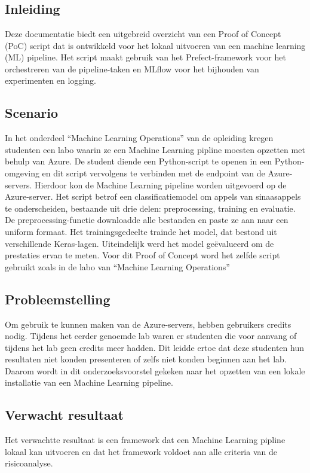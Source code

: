 \chapter{}%
\label{ch:PoC}

\section{Inleiding}
Deze documentatie biedt een uitgebreid overzicht van een Proof of Concept (PoC) script dat is ontwikkeld voor het lokaal uitvoeren van een machine learning (ML) pipeline. Het script maakt gebruik van het Prefect-framework voor het orchestreren van de pipeline-taken en MLflow voor het bijhouden van experimenten en logging.
\section{Scenario}
In het onderdeel ``Machine Learning Operations'' van de opleiding kregen studenten een labo waarin ze een Machine Learning pipline moesten opzetten met behulp van Azure. De student diende een Python-script te openen in een Python-omgeving en dit script vervolgens te verbinden met de endpoint van de Azure-servers.
Hierdoor kon de Machine Learning pipeline worden uitgevoerd op de Azure-server. Het script betrof een classificatiemodel om appels van sinaasappels te onderscheiden, bestaande uit drie delen: preprocessing, training en evaluatie. De preprocessing-functie downloadde alle bestanden en paste ze aan naar een uniform formaat. Het trainingsgedeelte trainde het model, dat bestond uit verschillende Keras-lagen. Uiteindelijk werd het model geëvalueerd om de prestaties ervan te meten.
Voor dit Proof of Concept word het zelfde script gebruikt zoals in de labo van ``Machine Learning Operations''

\section{Probleemstelling}
Om gebruik te kunnen maken van de Azure-servers, hebben gebruikers credits nodig. Tijdens het eerder genoemde lab waren er studenten die voor aanvang of tijdens het lab geen credits meer hadden. Dit leidde ertoe dat deze studenten hun resultaten niet konden presenteren of zelfs niet konden beginnen aan het lab.
Daarom wordt in dit onderzoeksvoorstel gekeken naar het opzetten van een lokale installatie van een Machine Learning pipeline.
\section{Verwacht resultaat}
Het verwachtte resultaat is een framework dat een Machine Learning pipline lokaal kan uitvoeren en dat het framework voldoet aan alle criteria van de risicoanalyse.
